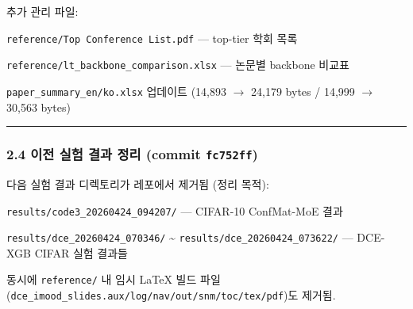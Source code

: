 추가 관리 파일:

\par\noindent \textbullet\enspace \texttt{referenc\allowbreak{}e/\allowbreak{}\allowbreak{}Top Co\allowbreak{}nference\allowbreak{} List.\allowbreak{}pd\allowbreak{}f} — top-tier 학회 목록


\par\noindent \textbullet\enspace \texttt{referenc\allowbreak{}e/\allowbreak{}\allowbreak{}lt\_\allowbreak{}\allowbreak{}bac\allowbreak{}kbone\_\allowbreak{}\allowbreak{}co\allowbreak{}mparison\allowbreak{}.\allowbreak{}xlsx} — 논문별 backbone 비교표


\par\noindent \textbullet\enspace \texttt{paper\_\allowbreak{}\allowbreak{}su\allowbreak{}mmary\_\allowbreak{}\allowbreak{}en\allowbreak{}/\allowbreak{}\allowbreak{}ko.\allowbreak{}xlsx\allowbreak{}} 업데이트 (14,893  \ensuremath{\rightarrow}  24,179 bytes /\allowbreak{} 14,999  \ensuremath{\rightarrow}  30,563 bytes)



\medskip\hrule\medskip
\subsubsection{2.4 이전 실험 결과 정리 (commit \texttt{fc752ff})}
다음 실험 결과 디렉토리가 레포에서 제거됨 (정리 목적):

\par\noindent \textbullet\enspace \texttt{results/\allowbreak{}\allowbreak{}code3\_\allowbreak{}\allowbreak{}20\allowbreak{}260424\_\allowbreak{}\allowbreak{}0\allowbreak{}94207/\allowbreak{}\allowbreak{}} — CIFAR-10 ConfMat-MoE 결과


\par\noindent \textbullet\enspace \texttt{results/\allowbreak{}\allowbreak{}dce\_\allowbreak{}\allowbreak{}2026\allowbreak{}0424\_\allowbreak{}\allowbreak{}070\allowbreak{}346/\allowbreak{}\allowbreak{}} \textasciitilde{} \texttt{results/\allowbreak{}\allowbreak{}dce\_\allowbreak{}\allowbreak{}2026\allowbreak{}0424\_\allowbreak{}\allowbreak{}073\allowbreak{}622/\allowbreak{}\allowbreak{}} — DCE-XGB CIFAR 실험 결과들


동시에 \texttt{referenc\allowbreak{}e/\allowbreak{}\allowbreak{}} 내 임시 LaTeX 빌드 파일(\texttt{dce\_\allowbreak{}\allowbreak{}imoo\allowbreak{}d\_\allowbreak{}\allowbreak{}slides\allowbreak{}.\allowbreak{}aux/\allowbreak{}\allowbreak{}log\allowbreak{}/\allowbreak{}\allowbreak{}nav/\allowbreak{}\allowbreak{}out\allowbreak{}/\allowbreak{}\allowbreak{}snm/\allowbreak{}\allowbreak{}toc\allowbreak{}/\allowbreak{}\allowbreak{}tex/\allowbreak{}\allowbreak{}pdf\allowbreak{}})도 제거됨.


